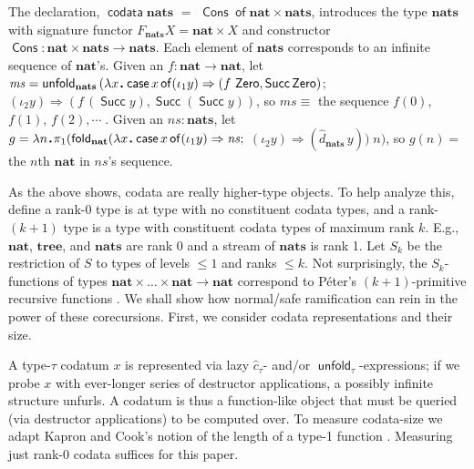 \documentclass[envcountsame]{llncs}
\newcommand{\co}[1]{\hat{#1}}
\newcommand{\key}[1]{\ensuremath{\mathop{\mathsf{#1}}\nolimits}\xspace}
\newcommand{\Case}{\key{case}}
\newcommand{\Of}{\key{of}}
\newcommand{\fold}{\key{fold}}
\newcommand{\unfold}{\key{unfold}}
\newcommand{\ms}{\mathit{ms}}
\newcommand{\ns}{\mathit{ns}}
\newcommand{\type}[1]{\ensuremath{\mathbf{#1}}\xspace}
\newcommand{\Nat}{\type{nat}}
\newcommand{\Tree}{\type{tree}}
\newcommand{\Nats}{\type{nats}}
\newcommand{\constr}[1]{\ensuremath{\mathop{\mathsf{#1}}\nolimits}\xspace}
\newcommand{\Zero}{\constr{Zero}}
\newcommand{\Succ}{\constr{Succ}}
\newcommand{\codata}{\constr{codata}}
\newcommand{\Cons}{\constr{Cons}}
\newcommand{\Topic}[1]{\smallskip\noindent{\textbf{#1{.}}}\enspace}
\newcommand{\sqdot}{\rule{0.5mm}{0.5mm}}
\newcommand{\lam}[1]{\lambda #1\,\sqdot\,}
\newcommand{\of}{\colon}
\renewcommand{\colon}{\mathpunct{:}}
\begin{document}
\begin{example}\label{ex:nats}
  The declaration, $\codata \Nats$ $=$ $\Cons\Of\Nat\times\Nats$,
  introduces the type $\Nats$ with signature functor 
  $F_{\Nats} X = \Nat \times X$ 
  and  constructor $\Cons\of \Nat\times\Nats\to\Nats$.
  Each element of $\Nats$ corresponds to an infinite 
  sequence of $\Nat$'s.
  Given an $f\of\Nat\to\Nat$, let 
  $\ms = \unfold_\Nats\,(\lam{x}\Case x \Of 
  (\iota_1 y) \Rightarrow (f\,\Zero,\allowbreak \Succ\Zero)$;
  $(\iota_2 y) \Rightarrow (f\,(\Succ y),\Succ (\Succ y))$,
  so $\ms \equiv$ the sequence $f(0)$, $f(1)$, $f(2), \cdots\;$.
  Given an $\ns\of\Nats$, let 
  $g=\lam{n}\pi_1(\fold_\Nat (\lam{x}\Case x \Of
   (\iota_1 y) \Rightarrow \ns;$ 
  $(\iota_2 y) \Rightarrow (\co{d}_\Nats\,y)) \; n)$, 
   so $g(n) = $ the $n$th $\Nat$ in  $\ns$'s sequence. 
\end{example}

As the above shows, codata are really higher-type objects.  To help
analyze this, define
a rank-0 type is at type with no constituent codata types, and
a rank-$(k+1)$ type is a type with constituent codata types of maximum rank $k$.
E.g., $\Nat$, $\Tree$, and $\Nats$ are rank 0 and a stream of
$\Nats$ is rank 1.  Let $S_k$ be the restriction of $S$ to types of
levels $\leq 1$ and 
ranks $\leq k$.
Not surprisingly, the $S_k$-functions of types
$\Nat\times\dots\times\Nat\to\Nat$ correspond to P\'eter's
$(k+1)$-primitive recursive functions \cite{Longley:notions:1}.
We shall show how normal/safe ramification can rein in the power of
these corecursions.  First, we consider codata representations and
their size.














\Topic{Representation and Size}
A type-$\tau$ codatum $x$ is represented via lazy $\co{c}_\tau$-
and/or $\unfold_\tau$-expressions; if we probe $x$ with ever-longer
series of destructor applications, a possibly infinite structure
unfurls.  A codatum is thus a function-like object that must be
queried (via destructor applications) to be computed over.  To
measure codata-size we adapt Kapron and Cook's notion of the length
of a type-1 function \cite{KapronCook:mach}.  Measuring just rank-0
codata suffices for this paper.
\end{document}
